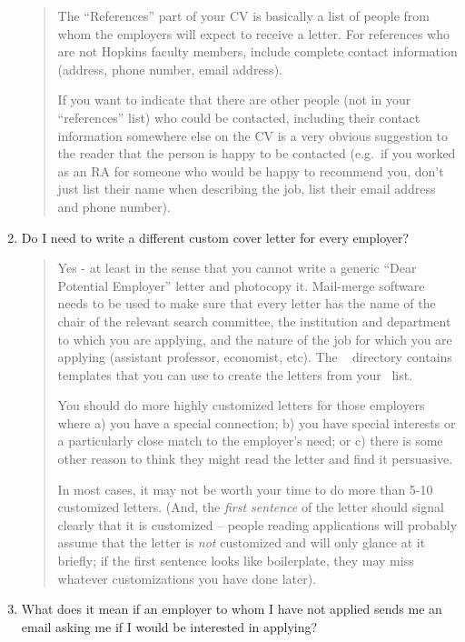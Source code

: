 \documentclass{\classes/econtex}
\providecommand\phantomsection{}
\begin{document}
\begin{enumerate}
    \begin{quote}
      The ``References'' part of your CV is basically a list of people from
      whom the employers will expect to receive a letter.  For references who
      are not Hopkins faculty members, include complete contact information
      (address, phone number, email address).

      If you want to indicate that there are other people (not in your
      ``references'' list) who could be contacted, including their contact
      information somewhere else on the CV is a very obvious suggestion to
      the reader that the person is happy to be contacted (e.g.\ if you
      worked as an RA for someone who would be happy to recommend you,
      don't just list their name when describing the job, list their email
      address and phone number).


    \end{quote}
  \item  Do I need to write a different custom cover letter for every employer?
    
    \begin{quote}
      Yes - at least in the sense that you cannot write a generic ``Dear Potential Employer'' letter
      and photocopy it.  Mail-merge software needs to be used to make sure
      that every letter has the name of the chair of the relevant search
      committee, the institution and department to which you are applying,
      and the nature of the job for which you are applying (assistant
      professor, economist, etc).  The \Templates~ directory contains templates that 
      you can use to create the letters from your \EMtt~list.  
      
      You should do more highly customized letters for those employers
      where a) you have a special connection; b) you have special
      interests or a particularly close match to the employer's need; or
      c) there is some other reason to think they might read the letter
      and find it persuasive.  

      In most cases, it may not be worth your time to do more than
      5-10 customized letters.  (And, the \textit{first sentence} of the letter should signal
      clearly that it is customized -- people reading applications will probably assume that the letter is \textit{not} customized and will only glance at it briefly; if the first sentence looks like boilerplate, they may miss whatever customizations you have done later).

      \ifdvi\phantomsection\hypertarget{WhatIfEmployerContactsStudent}{}\fi
    \end{quote}
  \item  What does it mean if an employer to whom I have not applied sends me an email asking me if I would be interested in applying?


\end{enumerate}
\end{document}
